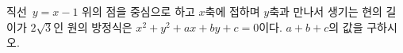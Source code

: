 직선~$y=x-1$ 위의 점을 중심으로 하고 $x$축에 접하며 $y$축과 만나서 생기는 현의 길이가 $2\sqrt3$인 원의 방정식은 $x^2+y^2+ax+by+c=0$이다. $a+b+c$의 값을 구하시오. 
